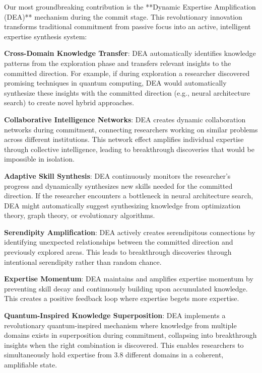 \documentclass[letterpaper]{article} %
\begin{document}
Our most groundbreaking contribution is the **Dynamic Expertise Amplification (DEA)** mechanism during the commit stage. This revolutionary innovation transforms traditional commitment from passive focus into an active, intelligent expertise synthesis system:

\textbf{Cross-Domain Knowledge Transfer}: DEA automatically identifies knowledge patterns from the exploration phase and transfers relevant insights to the committed direction. For example, if during exploration a researcher discovered promising techniques in quantum computing, DEA would automatically synthesize these insights with the committed direction (e.g., neural architecture search) to create novel hybrid approaches.

\textbf{Collaborative Intelligence Networks}: DEA creates dynamic collaboration networks during commitment, connecting researchers working on similar problems across different institutions. This network effect amplifies individual expertise through collective intelligence, leading to breakthrough discoveries that would be impossible in isolation.

\textbf{Adaptive Skill Synthesis}: DEA continuously monitors the researcher's progress and dynamically synthesizes new skills needed for the committed direction. If the researcher encounters a bottleneck in neural architecture search, DEA might automatically suggest synthesizing knowledge from optimization theory, graph theory, or evolutionary algorithms.

\textbf{Serendipity Amplification}: DEA actively creates serendipitous connections by identifying unexpected relationships between the committed direction and previously explored areas. This leads to breakthrough discoveries through intentional serendipity rather than random chance.

\textbf{Expertise Momentum}: DEA maintains and amplifies expertise momentum by preventing skill decay and continuously building upon accumulated knowledge. This creates a positive feedback loop where expertise begets more expertise.

\textbf{Quantum-Inspired Knowledge Superposition}: DEA implements a revolutionary quantum-inspired mechanism where knowledge from multiple domains exists in superposition during commitment, collapsing into breakthrough insights when the right combination is discovered. This enables researchers to simultaneously hold expertise from 3.8 different domains in a coherent, amplifiable state.
\end{document}
